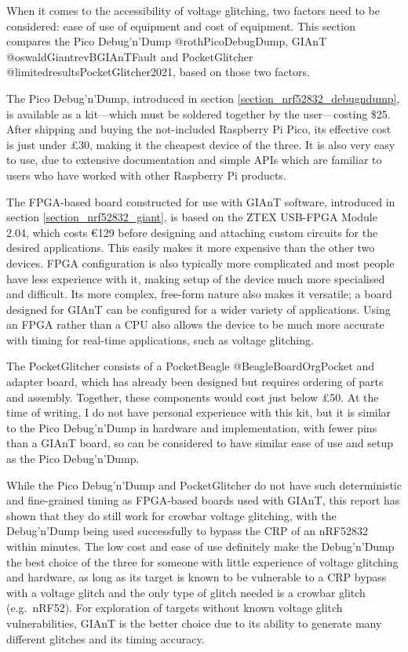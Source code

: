 When it comes to the accessibility of voltage glitching, two factors
need to be considered: ease of use of equipment and cost of equipment.
This section compares the Pico Debug'n'Dump @rothPicoDebugDump, GIAnT
@oswaldGiantrevBGIAnTFault and PocketGlitcher
@limitedresultsPocketGlitcher2021, based on those two factors.

The Pico Debug'n'Dump, introduced in section
\ref{section_nrf52832_debugndump}, is available as a kit---which must be
soldered together by the user---costing \$25. After shipping and buying
the not-included Raspberry Pi Pico, its effective cost is just under
£30, making it the cheapest device of the three. It is also very easy to
use, due to extensive documentation and simple APIs which are familiar
to users who have worked with other Raspberry Pi products.

The FPGA-based board constructed for use with GIAnT software, introduced
in section \ref{section_nrf52832_giant}, is based on the ZTEX USB-FPGA
Module 2.04, which costs €129 before designing and attaching custom
circuits for the desired applications. This easily makes it more
expensive than the other two devices. FPGA configuration is also
typically more complicated and most people have less experience with it,
making setup of the device much more specialised and difficult. Its more
complex, free-form nature also makes it versatile; a board designed for
GIAnT can be configured for a wider variety of applications. Using an
FPGA rather than a CPU also allows the device to be much more accurate
with timing for real-time applications, such as voltage glitching.

The PocketGlitcher consists of a PocketBeagle @BeagleBoardOrgPocket and
adapter board, which has already been designed but requires ordering of
parts and assembly. Together, these components would cost just below
£50. At the time of writing, I do not have personal experience with this
kit, but it is similar to the Pico Debug'n'Dump in hardware and
implementation, with fewer pins than a GIAnT board, so can be considered
to have similar ease of use and setup as the Pico Debug'n'Dump.

While the Pico Debug'n'Dump and PocketGlitcher do not have such
deterministic and fine-grained timing as FPGA-based boards used with
GIAnT, this report has shown that they do still work for crowbar voltage
glitching, with the Debug'n'Dump being used successfully to bypass the
CRP of an nRF52832 within minutes. The low cost and ease of use
definitely make the Debug'n'Dump the best choice of the three for
someone with little experience of voltage glitching and hardware, as
long as its target is known to be vulnerable to a CRP bypass with a
voltage glitch and the only type of glitch needed is a crowbar glitch
(e.g.~nRF52). For exploration of targets without known voltage glitch
vulnerabilities, GIAnT is the better choice due to its ability to
generate many different glitches and its timing accuracy.

